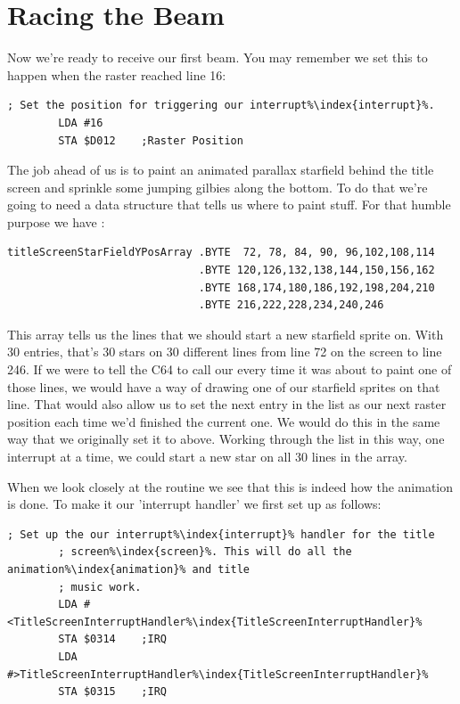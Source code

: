 \section{Racing the Beam}
Now we're ready to receive our first beam. You may remember we set this to happen when the raster reached line 16:

\begin{lstlisting}[caption=In \icode{InitializeSpritesAndInterruptsForTitleScreen\index{InitializeSpritesAndInterruptsForTitleScreen}},escapechar=\%]
        ; Set the position for triggering our interrupt%\index{interrupt}%.
        LDA #16
        STA $D012    ;Raster Position
\end{lstlisting}

The job ahead of us is to paint an animated parallax starfield behind the title screen and sprinkle some jumping gilbies
along the bottom. To do that we're going to need a data structure that tells us where to paint stuff. For that
humble purpose we have :
\begin{lstlisting}[escapechar=\%]
titleScreenStarFieldYPosArray .BYTE  72, 78, 84, 90, 96,102,108,114
                              .BYTE 120,126,132,138,144,150,156,162
                              .BYTE 168,174,180,186,192,198,204,210
                              .BYTE 216,222,228,234,240,246
\end{lstlisting}

This array tells us the lines that we should start a new starfield sprite on. With 30 entries,
that's 30 stars on 30 different lines from line 72 on the screen to line 246. If we were to tell the C64 to call our
 every time it was about to paint one of
those lines, we would have a way of drawing one of our starfield sprites on
that line. That would also allow us to set the next entry in the list as our
next raster position each time we'd finished the current one. We would do this in the same way
that we originally set it to  above. Working through the list in this way, one
interrupt at a time, we could start a new star on all 30 lines in the array.

When we look closely at the routine  we see that this is
indeed how the animation is done. To make it our 'interrupt handler' we first set up
 as follows:

\begin{lstlisting}[caption=In \icode{InitializeSpritesAndInterruptsForTitleScreen\index{InitializeSpritesAndInterruptsForTitleScreen}},escapechar=\%]
        ; Set up the our interrupt%\index{interrupt}% handler for the title
        ; screen%\index{screen}%. This will do all the animation%\index{animation}% and title
        ; music work.
        LDA #<TitleScreenInterruptHandler%\index{TitleScreenInterruptHandler}%
        STA $0314    ;IRQ
        LDA #>TitleScreenInterruptHandler%\index{TitleScreenInterruptHandler}%
        STA $0315    ;IRQ
\end{lstlisting}

